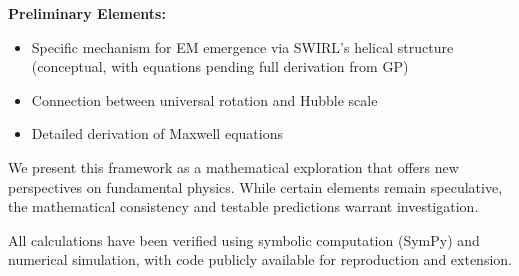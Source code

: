 \textbf{Preliminary Elements:}
\begin{itemize}
\item Specific mechanism for EM emergence via SWIRL's helical structure (conceptual, with equations pending full derivation from GP)
\item Connection between universal rotation and Hubble scale
\item Detailed derivation of Maxwell equations
\end{itemize}

We present this framework as a mathematical exploration that offers new perspectives on fundamental physics. While certain elements remain speculative, the mathematical consistency and testable predictions warrant investigation.

All calculations have been verified using symbolic computation (SymPy) and numerical simulation, with code publicly available for reproduction and extension.
